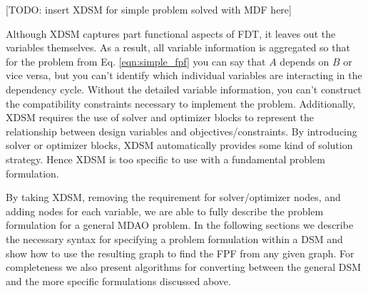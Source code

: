     [TODO: insert XDSM for simple problem solved with MDF here]

    Although XDSM captures part functional aspects of FDT, it leaves out the variables themselves. As a result, all variable information is aggregated 
    so that for the problem from Eq. \ref{eqn:simple_fpf} you can say that $A$ depends on $B$ or vice versa, but you can't identify which 
    individual variables are interacting in the dependency cycle. Without the detailed variable information, you can't construct the compatibility 
    constraints necessary to implement the problem. Additionally, XDSM requires the use of solver and optimizer blocks to represent 
    the relationship between design variables and objectives/constraints. By introducing solver or optimizer blocks, XDSM automatically provides
    some kind of solution strategy. Hence XDSM is too specific to use with a fundamental problem formulation. 

    By taking XDSM, removing the requirement for solver/optimizer nodes, and adding nodes for each variable, we are able to fully describe 
    the problem formulation for a general MDAO problem. In the following sections we describe the necessary syntax for specifying a 
    problem formulation within a DSM and show how to use the resulting graph to find the FPF from any given graph. For completeness we 
    also present algorithms for converting between the general DSM and the more specific formulations discussed above. 


